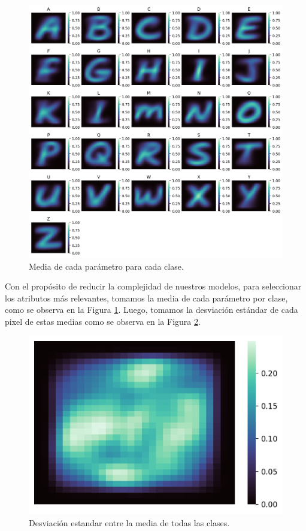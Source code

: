 \documentclass[11pt,a4paper, twocolumn]{article}
\begin{document}
\begin{figure}[H]
	\centering
	\includegraphics[scale=0.5]{figuras/1a.png}
	\caption{Media de cada parámetro para cada clase.}
	\label{fig:1a}
\end{figure}

Con el propósito de reducir la complejidad de nuestros modelos, para seleccionar los atributos más relevantes, tomamos la media de cada parámetro por clase, como se observa en la Figura \ref{fig:1a}. Luego, tomamos la desviación estándar de cada pixel de estas medias como se observa en la Figura \ref{fig:2a}.

\begin{figure}[H]

	\centering
	\includegraphics[scale=0.8]{figuras/2a.png}
	\caption{Desviación estandar entre la media de todas las clases.}
	\label{fig:2a}
\end{figure}
\end{document}
